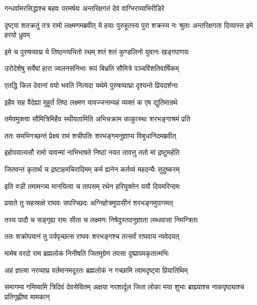 \twolineshloka
{गन्धर्वामरसिद्धाश्च बहवः परमर्षयः}
{अन्तरिक्षगतं देवं वाग्भिरग्र्याभिरीडिरे} %

\threelineshloka
{दृष्ट्वा शतक्रतुं तत्र रामो लक्ष्मणमब्रवीत्}
{ये हयाः पुरुहूतस्य पुरा शक्रस्य नः श्रुताः}
{अन्तरिक्षगता दिव्यास्त इमे हरयो ध्रुवम्} %

\twolineshloka
{इमे च पुरुषव्याघ्र ये तिष्ठन्त्यभितो रथम्}
{शतं शतं कुण्डलिनो युवानः खड्गपाणयः} %

\twolineshloka
{उरोदेशेषु सर्वेषां हारा ज्वलनसंनिभाः}
{रूपं बिभ्रति सौमित्रे पञ्चविंशतिवार्षिकम्} %

\twolineshloka
{एतद्धि किल देवानां वयो भवति नित्यदा}
{यथेमे पुरुषव्याघ्रा दृश्यन्ते प्रियदर्शनाः} %

\twolineshloka
{इहैव सह वैदेह्या मुहूर्तं तिष्ठ लक्ष्मण}
{यावज्जनाम्यहं व्यक्तं क एष द्युतिमान्रथे} %

\twolineshloka
{तमेवमुक्त्वा सौमित्रिमिहैव स्थीयतामिति}
{अभिचक्राम काकुत्स्थः शरभङ्गाश्रमं प्रति} %

\twolineshloka
{ततः समभिगच्छन्तं प्रेक्ष्य रामं शचीपतिः}
{शरभङ्गमनुज्ञाप्य विबुधानिदमब्रवीत्} %

\twolineshloka
{इहोपयात्यसौ रामो यावन्मां नाभिभाषते}
{निष्ठां नयत तावत्तु ततो मां द्रष्टुमर्हति} %

\twolineshloka
{जितवन्तं कृतार्थं च द्रष्टाहमचिरादिमम्}
{कर्म ह्यनेन कर्तव्यं महदन्यैः सुदुष्करम्} %

\twolineshloka
{इति वज्री तमामन्त्र्य मानयित्वा च तापसम्}
{रथेन हरियुक्तेन ययौ दिवमरिन्दमः} %

\twolineshloka
{प्रयाते तु सहस्राक्षे राघवः सपरिच्छदः}
{अग्निहोत्रमुपासीनं शरभङ्गमुपागमत्} %

\twolineshloka
{तस्य पादौ च सङ्गृह्य रामः सीता च लक्ष्मणः}
{निषेदुस्तदनुज्ञाता लब्धवासा निमन्त्रिताः} %

\twolineshloka
{ततः शक्रोपयानं तु पर्यपृच्छत्स राघवः}
{शरभङ्गश्च तत्सर्वं राघवाय न्यवेदयत्} %

\twolineshloka
{मामेष वरदो राम ब्रह्मलोकं निनीषति}
{जितमुग्रेण तपसा दुष्प्रापमकृतात्मभिः} %

\twolineshloka
{अहं ज्ञात्वा नरव्याघ्र वर्तमानमदूरतः}
{ब्रह्मलोकं न गच्छामि त्वामदृष्ट्वा प्रियातिथिम्} %

\threelineshloka
{समागम्य गमिष्यामि त्रिदिवं देवसेवितम्}
{अक्षया नरशार्दूल जिता लोका मया शुभाः}
{ब्राह्म्याश्च नाकपृष्ठ्याश्च प्रतिगृह्णीष्व मामकान्} %

